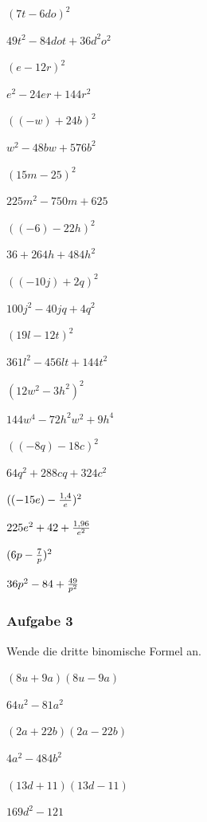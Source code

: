 \documentclass[
  ngerman,
]{book}
\begin{document}
\((7t-6do)^2\)

\leavevmode\hypertarget{toggleText38}{}%
\(49t^2-84dot+36d^2o^2\)

\((e-12r)^2\)

\leavevmode\hypertarget{toggleText39}{}%
\(e^2-24er+144r^2\)

\(((-w)+24b)^2\)

\leavevmode\hypertarget{toggleText40}{}%
\(w^2-48bw+576b^2\)

\((15m-25)^2\)

\leavevmode\hypertarget{toggleText41}{}%
\(225m^2-750m+625\)

\(((-6)-22h)^2\)

\leavevmode\hypertarget{toggleText42}{}%
\(36+264h+484h^2\)

\(((-10j)+2q)^2\)

\leavevmode\hypertarget{toggleText43}{}%
\(100j^2-40jq+4q^2\)

\((19l-12t)^2\)

\leavevmode\hypertarget{toggleText44}{}%
\(361l^2-456lt+144t^2\)

\((12w^2-3h^2)^2\)

\leavevmode\hypertarget{toggleText45}{}%
\(144w^4-72h^2w^2+9h^4\)

\(((-8q)-18c)^2\)

\leavevmode\hypertarget{toggleText46}{}%
\(64q^2+288cq+324c^2\)

\(((-15e)-{1,4 \over e})^2\)

\leavevmode\hypertarget{toggleText47}{}%
\(225e^2+42+{1,96 \over e^2}\)

\((6p- {7 \over p})^2\)

\leavevmode\hypertarget{toggleText48}{}%
\(36p^2- 84 +{49 \over p^2}\)

\hypertarget{aufgabe-3}{%
\subsubsection*{Aufgabe 3}\label{aufgabe-3}}

Wende die dritte binomische Formel an.

\((8u+9a)(8u-9a)\)

\leavevmode\hypertarget{toggleText49}{}%
\(64u^2-81a^2\)

\((2a+22b)(2a-22b)\)

\leavevmode\hypertarget{toggleText50}{}%
\(4a^2-484b^2\)

\((13d+11)(13d-11)\)

\leavevmode\hypertarget{toggleText51}{}%
\(169d^2-121\)
\end{document}
